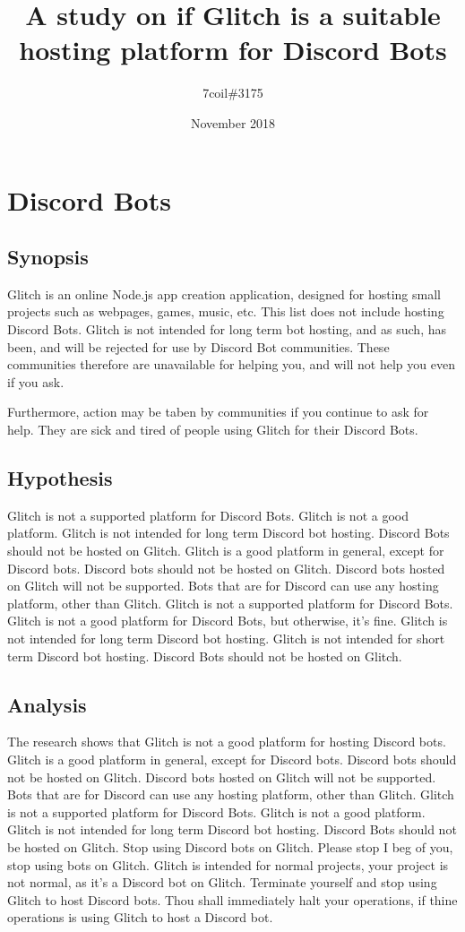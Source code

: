 \documentclass{article}
\title{A study on if Glitch is a suitable hosting platform for Discord Bots}
\date {November 2018}
\author{7coil\#3175}
\begin{document}
\maketitle

\section*{Discord Bots}

\subsection*{Synopsis}
Glitch is an online Node.js app creation application,
designed for hosting small projects such as webpages, games, music, etc.
This list does not include hosting Discord Bots.
Glitch is not intended for long term bot hosting,
and as such, has been, and will be rejected for use by Discord Bot communities.
These communities therefore are unavailable for helping you,
and will not help you even if you ask.

Furthermore, action may be taben by communities if you continue to ask for help.
They are sick and tired of people using Glitch for their Discord Bots.

\subsection*{Hypothesis}
Glitch is not a supported platform for Discord Bots.
Glitch is not a good platform.
Glitch is not intended for long term Discord bot hosting.
Discord Bots should not be hosted on Glitch.
Glitch is a good platform in general, except for Discord bots.
Discord bots should not be hosted on Glitch.
Discord bots hosted on Glitch will not be supported.
Bots that are for Discord can use any hosting platform, other than Glitch.
Glitch is not a supported platform for Discord Bots.
Glitch is not a good platform for Discord Bots, but otherwise, it's fine.
Glitch is not intended for long term Discord bot hosting.
Glitch is not intended for short term Discord bot hosting.
Discord Bots should not be hosted on Glitch.

\subsection*{Analysis}
The research shows that Glitch is not a good platform for hosting Discord bots.
Glitch is a good platform in general, except for Discord bots.
Discord bots should not be hosted on Glitch.
Discord bots hosted on Glitch will not be supported.
Bots that are for Discord can use any hosting platform, other than Glitch.
Glitch is not a supported platform for Discord Bots.
Glitch is not a good platform.
Glitch is not intended for long term Discord bot hosting.
Discord Bots should not be hosted on Glitch.
Stop using Discord bots on Glitch.
Please stop I beg of you, stop using bots on Glitch.
Glitch is intended for normal projects, your project is not normal,
as it’s a Discord bot on Glitch.
Terminate yourself and stop using Glitch to host Discord bots.
Thou shall immediately halt your operations,
if thine operations is using Glitch to host a Discord bot.
\end{document}
